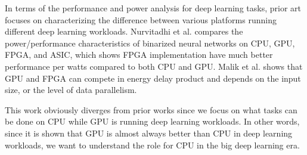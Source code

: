 In terms of the performance and power analysis for deep learning tasks, prior art focuses on characterizing the difference between various platforms running different deep learning workloads. Nurvitadhi et al. \cite{nurvitadhi2016accelerating} compares the power/performance characteristics of binarized neural networks on CPU, GPU, FPGA, and ASIC, which shows FPGA implementation have much better performance per watts compared to both CPU and GPU. Malik et al. \cite{malik2016architecture} shows that GPU and FPGA can compete in energy delay product and depends on the input size, or the level of data parallelism.

This work obviously diverges from prior works since we focus on what tasks can be done on CPU while GPU is running deep learning workloads. In other words, since it is shown that GPU is almost always better than CPU in deep learning workloads, we want to understand the role for CPU in the big deep learning era.